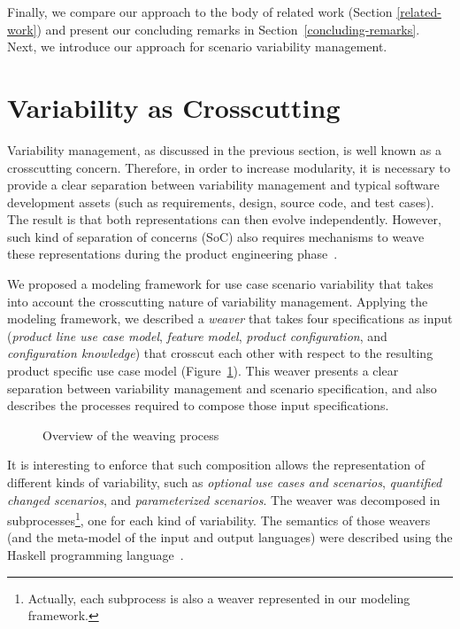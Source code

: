 \documentclass{acm_proc_article-sp}
\begin{document}
Finally, we compare our approach to the body of related work (Section \ref{related-work}) and present our concluding remarks in 
Section~\ref{concluding-remarks}. Next, we introduce our approach for scenario variability management.
   
\section{Variability as Crosscutting}
\label{scenario-variability}

Variability management, as discussed in the previous section, is well known as a crosscutting concern. Therefore, in order to increase modularity, it is necessary to provide a clear separation between 
variability management and typical software development assets (such as requirements, design, source code, and test cases). The result is that both representations can then evolve independently. However, such kind of separation of concerns (SoC) also requires mechanisms to weave these representations during the product engineering phase~\cite{northrop-spl-book}.

We proposed a modeling framework for use case scenario variability that takes into account the crosscutting nature of variability management. Applying the modeling framework, we described a \emph{weaver} that takes four specifications as input (\emph{product line use case model}, \emph{feature model}, \emph{product configuration}, and \emph{configuration knowledge}) that crosscut each other with respect to the resulting product specific use case model (Figure~\ref{fig:wp}). This weaver presents a clear separation between variability management and scenario specification, and also describes the 
processes required to compose those input specifications. 

\begin{figure}[h]
\centering
{}
\caption{Overview of the weaving process}
\label{fig:wp}
\end{figure}

It is interesting to enforce that such composition allows the representation of different kinds of variability, such as \emph{optional use cases and scenarios}, \emph{quantified changed scenarios}, and 
\emph{parameterized scenarios}. The weaver was decomposed in subprocesses\footnote{Actually, each subprocess is also a weaver represented in our modeling framework.}, one for each kind of variability. The semantics of those weavers (and the meta-model of the input and output languages) were described using the Haskell programming language~\cite{haskell-report}.
\end{document}
